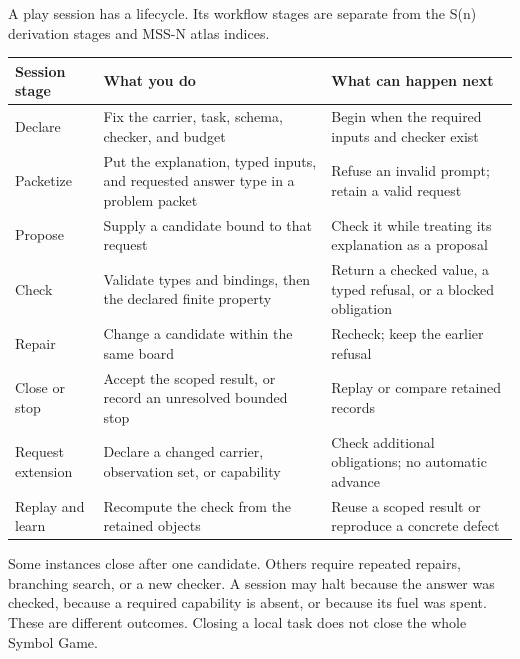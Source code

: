 \documentclass[
  11pt,
]{article}
\begin{document}
A play session has a lifecycle. Its workflow stages are separate from
the S(n) derivation stages and MSS-N atlas indices.

\begin{longtable}[]{@{}
  >{\raggedright\arraybackslash}p{}
  >{\raggedright\arraybackslash}p{}
  >{\raggedright\arraybackslash}p{}@{}}
\toprule\noalign{}
\begin{minipage}[b]{\linewidth}\raggedright
Session stage
\end{minipage} & \begin{minipage}[b]{\linewidth}\raggedright
What you do
\end{minipage} & \begin{minipage}[b]{\linewidth}\raggedright
What can happen next
\end{minipage} \\
\midrule\noalign{}
\endhead
\bottomrule\noalign{}
\endlastfoot
Declare & Fix the carrier, task, schema, checker, and budget & Begin
when the required inputs and checker exist \\
Packetize & Put the explanation, typed inputs, and requested answer type
in a problem packet & Refuse an invalid prompt; retain a valid
request \\
Propose & Supply a candidate bound to that request & Check it while
treating its explanation as a proposal \\
Check & Validate types and bindings, then the declared finite property &
Return a checked value, a typed refusal, or a blocked obligation \\
Repair & Change a candidate within the same board & Recheck; keep the
earlier refusal \\
Close or stop & Accept the scoped result, or record an unresolved
bounded stop & Replay or compare retained records \\
Request extension & Declare a changed carrier, observation set, or
capability & Check additional obligations; no automatic advance \\
Replay and learn & Recompute the check from the retained objects & Reuse
a scoped result or reproduce a concrete defect \\
\end{longtable}

Some instances close after one candidate. Others require repeated
repairs, branching search, or a new checker. A session may halt because
the answer was checked, because a required capability is absent, or
because its fuel was spent. These are different outcomes. Closing a
local task does not close the whole Symbol Game.
\end{document}
